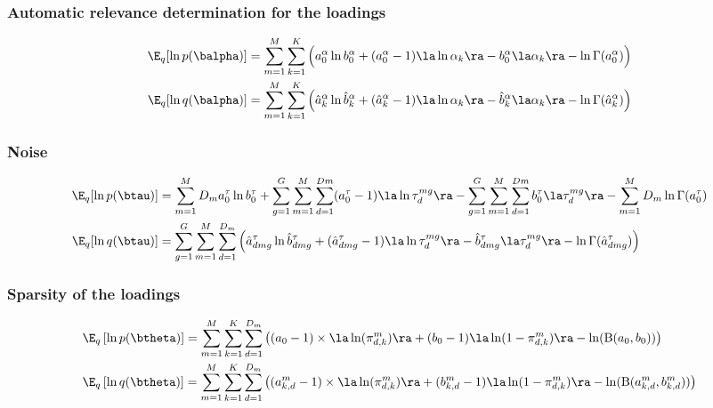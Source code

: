 \subsubsection*{Automatic relevance determination for the loadings}
\begin{equation} \begin{aligned}
	\E_q [\ln p(\balpha)] &= \sum_{m=1}^{M}\sum_{k=1}^{K}\Big(a_0^\alpha\ln b_0^\alpha +   (a_0^\alpha - 1) \la \ln \alpha_k \ra - b_0^\alpha \la \alpha_k \ra - \ln \Gamma(a_0^\alpha) \Big) \\
	\E_q [\ln q(\balpha)] &= \sum_{m=1}^{M}\sum_{k=1}^{K} \Big( \hat{a}_{k}^\alpha \ln \hat{b}_{k}^\alpha + (\hat{a}_{k}^\alpha - 1) \la \ln \alpha_k \ra - \hat{b}_{k}^\alpha \la \alpha_k \ra - \ln \Gamma(\hat{a}_{k}^\alpha) \Big)
\end{aligned} \end{equation}

\subsubsection*{Noise}
\begin{equation} \begin{aligned}
	\E_q [\ln p(\btau)] &= \sum_{m=1}^{M} D_m a_0^\tau \ln b_0^\tau + \sum_{g=1}^{G}\sum_{m=1}^{M}\sum_{d=1}^{Dm} (a_0^\tau - 1) \la \ln \tau_d^{mg} \ra - \sum_{g=1}^{G}\sum_{m=1}^{M}\sum_{d=1}^{Dm} b_0^\tau \la \tau_d^{mg} \ra - \sum_{m=1}^{M} D_m \ln \Gamma(a_0^\tau)\\
	\E_q [\ln q(\btau)] &= \sum_{g=1}^{G} \sum_{m=1}^{M} \sum_{d=1}^{D_m} \left( \hat{a}_{dmg}^\tau \ln \hat{b}_{dmg}^\tau + (\hat{a}_{dmg}^\tau - 1) \la \ln \tau_d^{mg} \ra - \hat{b}_{dmg}^\tau \la \tau_d^{mg} \ra - \ln \Gamma(\hat{a}_{dmg}^\tau) \right)
\end{aligned} \end{equation}

\subsubsection*{Sparsity of the loadings}
\begin{equation} \begin{aligned}
	  &\E_q\left[ \ln p(\btheta) \right] = \sum_{m=1}^M \sum_{k=1}^K\sum_{d=1}^{D_m}\left( (a_0 - 1) \times \la \ln(\pi^m_{d, k}) \ra + (b_0 -1) \la \ln(1 - \pi^m_{d, k}) \ra - \ln (\mathrm{B} (a_0, b_0))\right) \\
	  &\E_q\left[ \ln q(\btheta) \right] = \sum_{m=1}^M \sum_{k=1}^K\sum_{d=1}^{D_m}\left( (a^m_{k,d} - 1) \times \la \ln(\pi^m_{d, k}) \ra + (b^m_{k,d} -1) \la \ln(1 - \pi^m_{d, k}) \ra - \ln (\mathrm{B} (a^m_{k,d}, b^m_{k,d})) \right) \\
\end{aligned} \end{equation}

